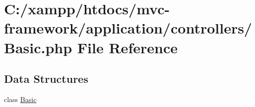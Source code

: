 \hypertarget{_basic_8php}{}\section{C\+:/xampp/htdocs/mvc-\/framework/application/controllers/\+Basic.php File Reference}
\label{_basic_8php}
\subsection*{Data Structures}
\begin{DoxyCompactItemize}
\item 
class \hyperlink{class_basic}{Basic}
\end{DoxyCompactItemize}
